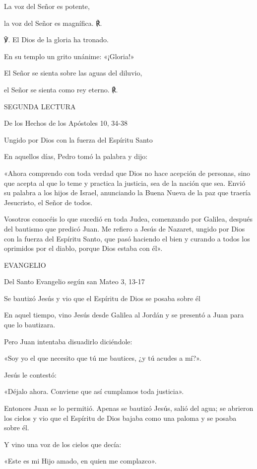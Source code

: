 \documentclass[]{article}
\begin{document}
La voz del Señor es potente,

la voz del Señor es magnífica. ℟.

℣. El Dios de la gloria ha tronado.

En su templo un grito unánime: «¡Gloria!»

El Señor se sienta sobre las aguas del diluvio,

el Señor se sienta como rey eterno. ℟.

SEGUNDA LECTURA

De los Hechos de los Apóstoles 10, 34-38

Ungido por Dios con la fuerza del Espíritu Santo

En aquellos días, Pedro tomó la palabra y dijo:

«Ahora comprendo con toda verdad que Dios no hace acepción de personas,
sino que acepta al que lo teme y practica la justicia, sea de la nación
que sea. Envió su palabra a los hijos de Israel, anunciando la Buena
Nueva de la paz que traería Jesucristo, el Señor de todos.

Vosotros conocéis lo que sucedió en toda Judea, comenzando por Galilea,
después del bautismo que predicó Juan. Me refiero a Jesús de Nazaret,
ungido por Dios con la fuerza del Espíritu Santo, que pasó haciendo el
bien y curando a todos los oprimidos por el diablo, porque Dios estaba
con él».

EVANGELIO

Del Santo Evangelio según san Mateo 3, 13-17

Se bautizó Jesús y vio que el Espíritu de Dios se posaba sobre él

En aquel tiempo, vino Jesús desde Galilea al Jordán y se presentó a Juan
para que lo bautizara.

Pero Juan intentaba disuadirlo diciéndole:

«Soy yo el que necesito que tú me bautices, ¿y tú acudes a mí?».

Jesús le contestó:

«Déjalo ahora. Conviene que así cumplamos toda justicia».

Entonces Juan se lo permitió. Apenas se bautizó Jesús, salió del agua;
se abrieron los cielos y vio que el Espíritu de Dios bajaba como una
paloma y se posaba sobre él.

Y vino una voz de los cielos que decía:

«Este es mi Hijo amado, en quien me
complazco».\protect\hypertarget{_Toc448662878}{}{\protect\hypertarget{_Toc448690397}{}{}}
\end{document}

